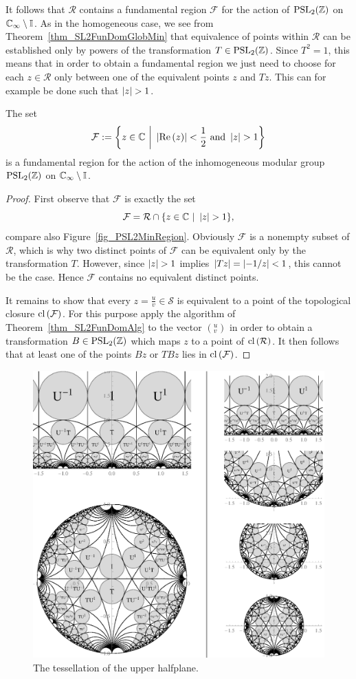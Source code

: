 It follows that $\mathcal{R}$ contains a fundamental region $\mathcal{F}$ for the action of $\operatorname{PSL}_{2}(\mathbb{Z})$ on $\mathbb{C}_{\infty} \setminus \mathbb{I}$. As in the homogeneous case, we see from Theorem~\ref{thm_SL2FunDomGlobMin} that equivalence of points within $\mathcal{R}$ can be established only by powers of the transformation $T \in \operatorname{PSL}_{2}(\mathbb{Z})$. Since $T^2 = 1$, this means that in order to obtain a fundamental region we just need to choose for each $z \in \mathcal{R}$ only between one of the equivalent points $z$ and $Tz$. This can for example be done such that $\left|z\right| > 1$.
\begin{corollary}
The set
\begin{equation}
\mathcal{F} := \bigg\{ z \in \mathbb{C} \ \bigg| \ \left|\operatorname{Re}\left(z\right)\right| < \frac{1}{2} \text{ and } \left|z\right| > 1 \bigg\}
\end{equation}
is a fundamental region for the action of the inhomogeneous modular group $\operatorname{PSL}_{2}(\mathbb{Z})$ on $\mathbb{C}_{\infty} \setminus \mathbb{I}$.
\end{corollary}
\begin{proof}
First observe that $\mathcal{F}$ is exactly the set
\begin{equation*}
\mathcal{F} = \mathcal{R} \cap \{ z \in \mathbb{C} \ | \ \left|z\right| > 1 \},
\end{equation*}
compare also Figure~\ref{fig_PSL2MinRegion}. Obviously $\mathcal{F}$ is a nonempty subset of $\mathcal{R}$, which is why two distinct points of $\mathcal{F}$ can be equivalent only by the transformation $T$. However, since $\left|z\right| > 1$ implies $\left|Tz\right| = \left|-1/z\right| < 1$, this cannot be the case. Hence $\mathcal{F}$ contains no equivalent distinct points.

It remains to show that every $z = \frac{u}{v} \in \mathcal{S}$ is equivalent to a point of the topological closure $\operatorname{cl}\left( \mathcal{F} \right)$. For this purpose apply the algorithm of Theorem~\ref{thm_SL2FunDomAlg} to the vector $({}^u_v)$ in order to obtain a transformation $B \in \operatorname{PSL}_{2}(\mathbb{Z})$ which maps $z$ to a point of $\operatorname{cl}\left( \mathcal{R} \right)$. It then follows that at least one of the points $Bz$ or $TBz$ lies in $\operatorname{cl}\left( \mathcal{F} \right)$.
\end{proof}

\begin{figure}
\centering
\includegraphics[width=\textwidth]{figures/modular-tiling-1}
\caption{The tessellation of the upper halfplane.}
\label{fig_ModularTiling}
\end{figure}
